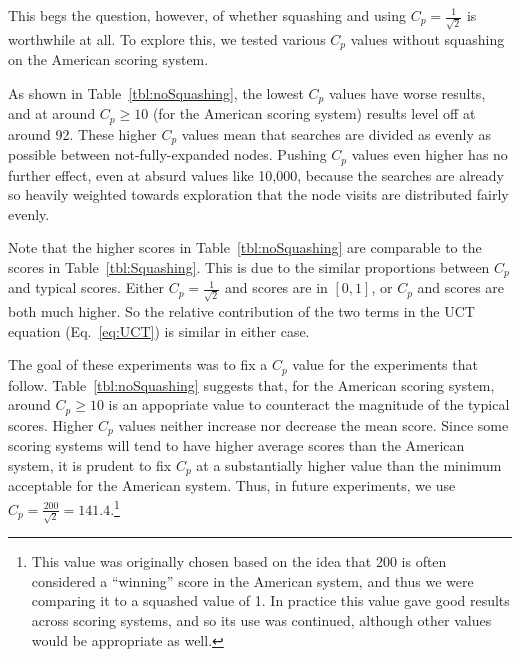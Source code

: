 \documentclass[letterpaper]{article}
\begin{document}
This begs the question, however, of whether squashing and using $C_p = \frac{1}{\sqrt{2}}$ is worthwhile at all. To explore this, we tested various $C_p$ values without squashing on the American scoring system.

As shown in  Table~\ref{tbl:noSquashing}, the lowest $C_p$ values have worse results, and at around $C_p \geq 10$ (for the American scoring system) results level off at around 92. These higher $C_p$ values mean that searches are divided as evenly as possible between not-fully-expanded nodes. Pushing $C_p$ values even higher has no further effect, even at absurd values like 10,000, because the searches are already so heavily weighted towards exploration that the node visits are distributed fairly evenly.

Note that the higher scores in Table~\ref{tbl:noSquashing} are comparable to the scores in Table~\ref{tbl:Squashing}. This is due to the similar proportions between $C_p$ and typical scores. Either $C_p  = \frac{1}{\sqrt{2}}$ and scores are in $[0,1]$, or $C_p$ and scores are both much higher. So the relative contribution of the two terms in the UCT equation (Eq.~\ref{eq:UCT}) is similar in either case.

The goal of these experiments was to fix a $C_p$ value for the experiments that follow. Table~\ref{tbl:noSquashing} suggests that, for the American scoring system, around $C_p \geq 10$ is an appopriate value to counteract the magnitude of the typical scores. Higher $C_p$ values neither increase nor decrease the mean score. Since some scoring systems will tend to have higher average scores than the American system, it is prudent to fix $C_p$ at a substantially higher value than the minimum acceptable for the American system. Thus, in future experiments, we use $C_p = \frac{200}{\sqrt{2}} = 141.4$.\footnote{This value was originally chosen based on the idea that 200 is often considered a ``winning'' score in the American system, and thus we were comparing it to a squashed value of 1. In practice this value gave good results across scoring systems, and so its use was continued, although other values would be appropriate as well.}

\end{document}
